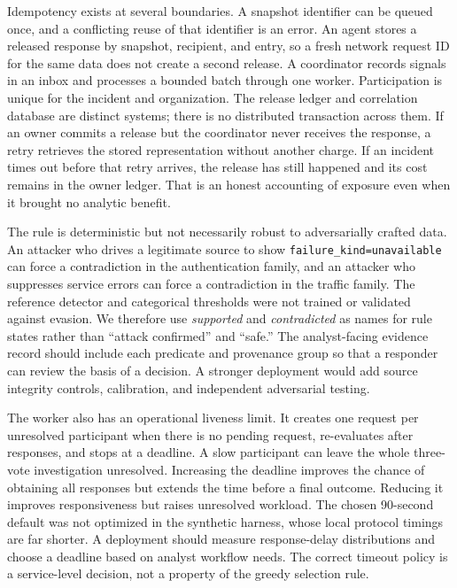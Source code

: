 \documentclass[conference,letterpaper]{IEEEtran}
\begin{document}
Idempotency exists at several boundaries. A snapshot identifier can be queued once, and a conflicting reuse of that identifier is an error. An agent stores a released response by snapshot, recipient, and entry, so a fresh network request ID for the same data does not create a second release. A coordinator records signals in an inbox and processes a bounded batch through one worker. Participation is unique for the incident and organization. The release ledger and correlation database are distinct systems; there is no distributed transaction across them. If an owner commits a release but the coordinator never receives the response, a retry retrieves the stored representation without another charge. If an incident times out before that retry arrives, the release has still happened and its cost remains in the owner ledger. That is an honest accounting of exposure even when it brought no analytic benefit.

The rule is deterministic but not necessarily robust to adversarially crafted data. An attacker who drives a legitimate source to show \texttt{failure\_kind=unavailable} can force a contradiction in the authentication family, and an attacker who suppresses service errors can force a contradiction in the traffic family. The reference detector and categorical thresholds were not trained or validated against evasion. We therefore use \emph{supported} and \emph{contradicted} as names for rule states rather than ``attack confirmed'' and ``safe.'' The analyst-facing evidence record should include each predicate and provenance group so that a responder can review the basis of a decision. A stronger deployment would add source integrity controls, calibration, and independent adversarial testing.

The worker also has an operational liveness limit. It creates one request per unresolved participant when there is no pending request, re-evaluates after responses, and stops at a deadline. A slow participant can leave the whole three-vote investigation unresolved. Increasing the deadline improves the chance of obtaining all responses but extends the time before a final outcome. Reducing it improves responsiveness but raises unresolved workload. The chosen 90-second default was not optimized in the synthetic harness, whose local protocol timings are far shorter. A deployment should measure response-delay distributions and choose a deadline based on analyst workflow needs. The correct timeout policy is a service-level decision, not a property of the greedy selection rule.
\end{document}
